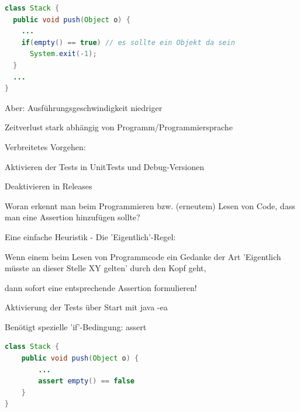 \documentclass[10pt]{article}
\begin{document}
\begin{lstlisting}[language=java]
class Stack {
  public void push(Object o) {
    ...
    if(empty() == true) // es sollte ein Objekt da sein
      System.exit(-1);
  }
  ...
}
\end{lstlisting}

Aber: Ausführungsgeschwindigkeit niedriger
\begin{itemize*}
  \item Zeitverlust stark abhängig von Programm/Programmiersprache
  \item Verbreitetes Vorgehen:
  \begin{itemize*}
    \item Aktivieren der Tests in UnitTests und Debug-Versionen
    \item Deaktivieren in Releases
  \end{itemize*}
  \item Woran erkennt man beim Programmieren bzw. (erneutem) Lesen von Code, dass man eine Assertion hinzufügen sollte?
  \item Eine einfache Heuristik - Die 'Eigentlich'-Regel:
  \begin{itemize*}
    \item Wenn einem beim Lesen von Programmcode ein Gedanke der Art 'Eigentlich müsste an dieser Stelle XY gelten' durch den Kopf geht,
    \item dann sofort eine entsprechende Assertion formulieren!
  \end{itemize*}
  \item Aktivierung der Tests über Start mit java -ea
  \item Benötigt spezielle 'if'-Bedingung: assert
\end{itemize*}
\begin{lstlisting}[language=java]
class Stack {
    public void push(Object o) {
        ...
        assert empty() == false
    }
}
\end{lstlisting}
\end{document}
